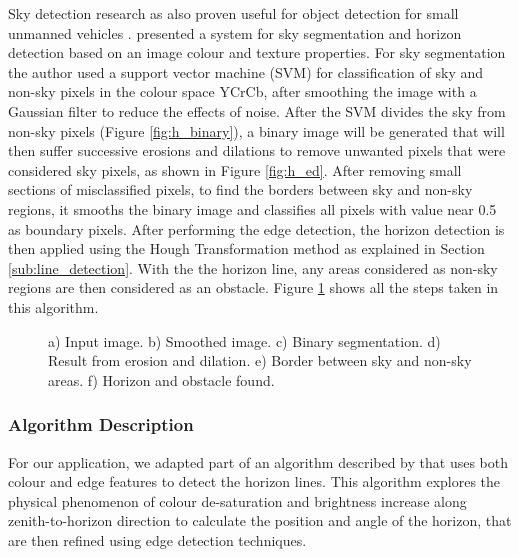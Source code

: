 Sky detection research as also proven useful for object detection for small unmanned vehicles \cite{mcgee2005obstacle}. \citeauthor{mcgee2005obstacle} \cite{mcgee2005obstacle} presented a system for sky segmentation and horizon detection based on an image colour and texture properties.
For sky segmentation the author used a support vector machine (SVM) for classification of sky and non-sky pixels in the colour space YCrCb, after smoothing the image with a Gaussian filter to reduce the effects of noise. After the SVM divides the sky from non-sky pixels (Figure \ref{fig:h_binary}), a binary image will be generated that will then suffer successive erosions and dilations to remove unwanted pixels that were considered sky pixels, as shown in Figure \ref{fig:h_ed}. After removing small sections of misclassified pixels, to find the borders between sky and non-sky regions, it smooths the binary image and classifies all pixels with value near 0.5 as boundary pixels. After performing the edge detection, the horizon detection is then applied using the Hough Transformation method as explained in Section \ref{sub:line_detection}. With the the horizon line, any areas considered as non-sky regions are then considered as an obstacle. Figure \ref{fig:horizon} shows all the steps taken in this algorithm.
\begin{figure}[htbp]
	\centering
    \caption{a) Input image. b) Smoothed image. c) Binary segmentation. d) Result from erosion and dilation. e) Border between sky and non-sky areas. f) Horizon and obstacle found.}
    \label{fig:horizon}
\end{figure}

\subsubsection{Algorithm Description}
For our application, we adapted part of an algorithm described by \citeauthor{zafarifar2008horizon} \cite{zafarifar2008horizon} that uses both colour and edge features to detect the horizon lines. This algorithm explores the physical phenomenon of colour de-saturation and brightness increase along zenith-to-horizon direction to calculate the position and angle of the horizon, that are then refined using edge detection techniques.

